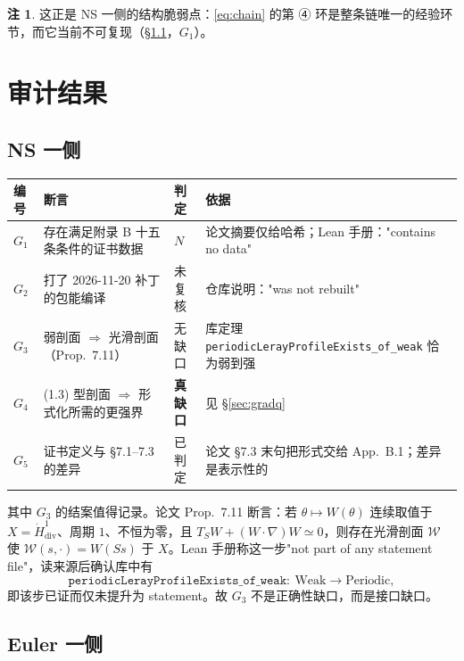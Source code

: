\documentclass[11pt,a4paper]{ctexart}
\theoremstyle{definition}
\newtheorem{remark}[theorem]{注}
\newcommand{\diverg}{\operatorname{div}}
\begin{document}
\begin{remark}
这正是 NS 一侧的结构脆弱点：\eqref{eq:chain} 的第 ④ 环是整条链唯一的经验环节，而它当前不可复现（\S\ref{sec:ns}，$G_1$）。
\end{remark}

\section{审计结果}\label{sec:result}

\subsection{NS 一侧}\label{sec:ns}

\begin{center}
\begin{tabular}{@{}p{1.3cm}p{7.2cm}p{1.5cm}p{4.4cm}@{}}
\toprule
编号 & 断言 & 判定 & 依据 \\
\midrule
$G_1$ & 存在满足附录 B 十五条条件的证书数据 & $N$ & 论文摘要仅给哈希；Lean 手册："contains no data" \\
$G_2$ & 打了 2026-11-20 补丁的包能编译 & 未复核 & 仓库说明："was not rebuilt" \\
$G_3$ & 弱剖面 $\Rightarrow$ 光滑剖面（Prop.~7.11） & 无缺口 & 库定理 \texttt{periodicLerayProfileExists\_of\_weak} 恰为弱到强 \\
$G_4$ & (1.3) 型剖面 $\Rightarrow$ 形式化所需的更强界 & \textbf{真缺口} & 见 \S\ref{sec:gradq} \\
$G_5$ & 证书定义与 \S7.1--7.3 的差异 & 已判定 & 论文 \S7.3 末句把形式交给 App.~B.1；差异是表示性的 \\
\bottomrule
\end{tabular}
\end{center}

\noindent 其中 $G_3$ 的结案值得记录。论文 Prop.~7.11 断言：若 $\theta\mapsto W(\theta)$ 连续取值于 $X=\dot H^1_{\diverg}$、周期 $1$、不恒为零，且 $T_SW+(W\cdot\nabla)W\simeq0$，则存在光滑剖面 $\mathcal W$ 使 $\mathcal W(s,\cdot)=W(Ss)$ 于 $X$。Lean 手册称这一步"not part of any statement file"，读来源后确认库中有
\[
\texttt{periodicLerayProfileExists\_of\_weak}:\ \mathrm{Weak}\longrightarrow\mathrm{Periodic},
\]
即该步已证而仅未提升为 statement。故 $G_3$ 不是正确性缺口，而是接口缺口。

\subsection{Euler 一侧}
\end{document}
